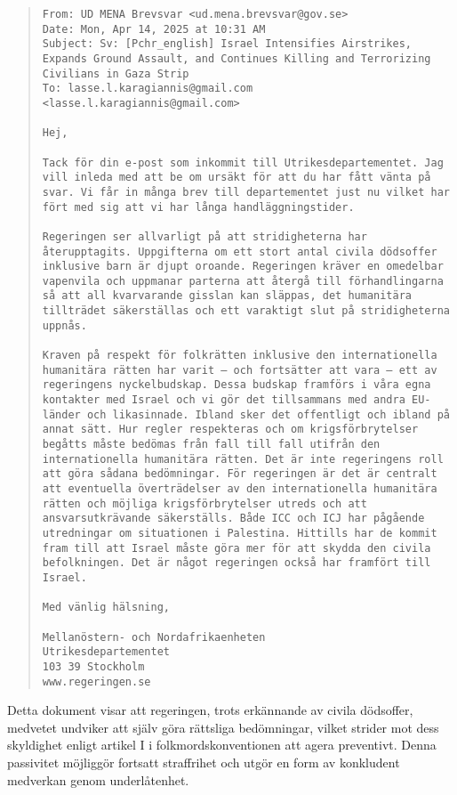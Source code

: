\begin{quote}
\begin{lstlisting}
From: UD MENA Brevsvar <ud.mena.brevsvar@gov.se>
Date: Mon, Apr 14, 2025 at 10:31 AM
Subject: Sv: [Pchr_english] Israel Intensifies Airstrikes, Expands Ground Assault, and Continues Killing and Terrorizing Civilians in Gaza Strip
To: lasse.l.karagiannis@gmail.com <lasse.l.karagiannis@gmail.com>

Hej,

Tack för din e-post som inkommit till Utrikesdepartementet. Jag vill inleda med att be om ursäkt för att du har fått vänta på svar. Vi får in många brev till departementet just nu vilket har fört med sig att vi har långa handläggningstider.

Regeringen ser allvarligt på att stridigheterna har återupptagits. Uppgifterna om ett stort antal civila dödsoffer inklusive barn är djupt oroande. Regeringen kräver en omedelbar vapenvila och uppmanar parterna att återgå till förhandlingarna så att all kvarvarande gisslan kan släppas, det humanitära tillträdet säkerställas och ett varaktigt slut på stridigheterna uppnås.

Kraven på respekt för folkrätten inklusive den internationella humanitära rätten har varit – och fortsätter att vara – ett av regeringens nyckelbudskap. Dessa budskap framförs i våra egna kontakter med Israel och vi gör det tillsammans med andra EU-länder och likasinnade. Ibland sker det offentligt och ibland på annat sätt. Hur regler respekteras och om krigsförbrytelser begåtts måste bedömas från fall till fall utifrån den internationella humanitära rätten. Det är inte regeringens roll att göra sådana bedömningar. För regeringen är det är centralt att eventuella överträdelser av den internationella humanitära rätten och möjliga krigsförbrytelser utreds och att ansvarsutkrävande säkerställs. Både ICC och ICJ har pågående utredningar om situationen i Palestina. Hittills har de kommit fram till att Israel måste göra mer för att skydda den civila befolkningen. Det är något regeringen också har framfört till Israel.

Med vänlig hälsning,

Mellanöstern- och Nordafrikaenheten
Utrikesdepartementet
103 39 Stockholm
www.regeringen.se
\end{lstlisting}
\end{quote}

\vspace{1em}

Detta dokument visar att regeringen, trots erkännande av civila dödsoffer, medvetet undviker att själv göra 
rättsliga bedömningar, vilket strider mot dess skyldighet enligt artikel I i folkmordskonventionen att 
agera preventivt. Denna passivitet möjliggör fortsatt straffrihet och utgör en form av konkludent 
medverkan genom underlåtenhet.

